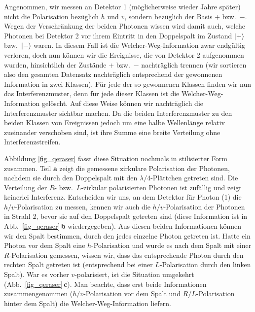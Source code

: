  Angenommen, wir messen an Detektor 1 (m\"oglicherweise wieder
 \glqq Jahre sp\"ater\grqq) nicht die Polarisation bez\"uglich 
 $h$ und $v$, sondern bez\"uglich der Basis $+$ bzw.\ $-$.
 Wegen der Verschr\"ankung der beiden Photonen wissen
 wird damit auch, welche Photonen bei Detektor 2
vor ihrem Eintritt in den Doppelspalt
 im Zustand $|+\rangle$ bzw.\ $|-\rangle$ waren. In diesem
 Fall ist die \glq Welcher-Weg\grq-Information zwar endg\"ultig
 verloren, doch nun k\"onnen wir die Ereignisse, die von
 Detektor 2 aufgenommen wurden, hinsichtlich der Zust\"ande
 $+$ bzw.\ $-$ nachtr\"aglich trennen (wir sortieren also den
 gesamten Datensatz nachtr\"aglich entsprechend der
 gewonnenen Information in zwei Klassen). F\"ur jede der
 so gewonnenen Klassen finden wir nun das Inter\-ferenz\-mus\-ter,
 denn f\"ur jede dieser Klassen ist die 
 \glq Welcher-Weg\grq-Information
 gel\"oscht. Auf diese Weise k\"onnen wir nachtr\"aglich
 die Interferenzmuster sichtbar machen. Da die beiden
 Interferenzmuster zu den beiden Klassen von Ereignissen
 jedoch um eine halbe Wellenl\"ange relativ zueinander
 verschoben sind, ist ihre Summe eine breite Verteilung
 ohne Interferenzstreifen. 
 
Abbildung \ref{fig_qeraser} fasst diese Situation
nochmals in stilisierter Form zusammen. Teil \textbf{a} 
zeigt die gemessene zirkulare Polarisation 
der Photonen, nachdem sie durch den Doppelspalt
mit den $\lambda/4$-Pl\"attchen getreten sind.
Die Verteilung der $R$- bzw.\ $L$-zirkular polarisierten
Photonen ist zuf\"allig und zeigt keinerlei Interferenz.
Entscheiden wir uns, an dem Detektor f\"ur Photon
(1) die $h/v$-Polarisation zu messen, kennen wir
auch die $h/v$-Polarisation der Photonen in Strahl 2, 
bevor sie auf den Doppelspalt getreten sind (diese Information
ist in Abb.\
\ref{fig_qeraser}\,\textbf{b} wiedergegeben). 
Aus diesen beiden Informationen
k\"onnen wir den Spalt bestimmen, durch den
jedes einzelne Photon getreten ist. Hatte ein Photon
vor dem Spalt eine $h$-Polarisation und wurde es
nach dem Spalt mit einer $R$-Polarisation
gemessen, wissen wir, dass das entsprechende
Photon durch den rechten Spalt
getreten ist (entsprechend bei einer $L$-Polarisation
durch den linken Spalt). War es vorher $v$-polarisiert,
ist die Situation umgekehrt (Abb.\ \ref{fig_qeraser}\,\textbf{c}). 
Man beachte, dass erst beide Informationen
zusammengenommen ($h/v$-Polarisation vor dem Spalt
und $R/L$-Polarisation hinter dem Spalt) die
\glq Welcher-Weg\grq-Information liefern. 

